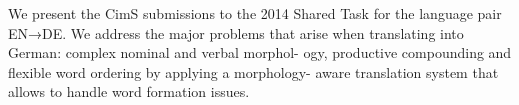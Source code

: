 We present the CimS submissions to the 2014 Shared Task for the language pair EN→DE. We address the major problems that arise when translating into German: complex nominal and verbal morphol- ogy, productive compounding and flexible word ordering by applying a morphology- aware translation system that allows to handle word formation issues.

